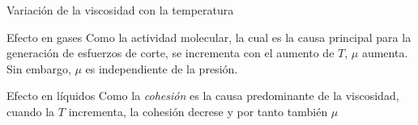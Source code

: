 \documentclass [xcolor=svgnames, t] {beamer}
\begin{document}
\begin{frame}{Variaci\'on de la viscosidad con la temperatura}
\begin{block}{Efecto en gases}
Como la actividad molecular, la cual es la causa principal para la generaci\'on de esfuerzos de corte, se incrementa con el aumento de $T$, $\mu$ aumenta. Sin embargo, $\mu$ es independiente de la presi\'on. 
\end{block}
\begin{block}{Efecto en l\'iquidos}
Como la \emph{cohesi\'on} es la causa predominante de la viscosidad, cuando la $T$ incrementa, la cohesi\'on decrese y por tanto tambi\'en $\mu$ 
\end{block}
\end{frame}

%
%
%
\end{document}

